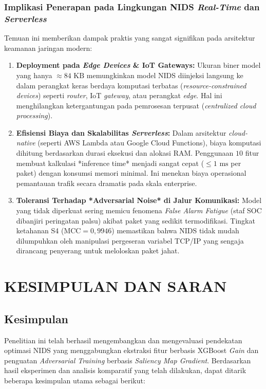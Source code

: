 \documentclass[11pt, a4paper]{article}
\begin{document}
\subsubsection{Implikasi Penerapan pada Lingkungan NIDS \textit{Real-Time} dan \textit{Serverless}}
Temuan ini memberikan dampak praktis yang sangat signifikan pada arsitektur keamanan jaringan modern:

\begin{enumerate}
    \item \textbf{Deployment pada \textit{Edge Devices} & IoT Gateways:}
    Ukuran biner model yang hanya $\approx 84\text{ KB}$ memungkinkan model NIDS diinjeksi langsung ke dalam perangkat keras berdaya komputasi terbatas (\textit{resource-constrained devices}) seperti \textit{router}, IoT \textit{gateway}, atau perangkat \textit{edge}. Hal ini menghilangkan ketergantungan pada pemrosesan terpusat (\textit{centralized cloud processing}).

    \item \textbf{Efisiensi Biaya dan Skalabilitas \textit{Serverless}:}
    Dalam arsitektur \textit{cloud-native} (seperti AWS Lambda atau Google Cloud Functions), biaya komputasi dihitung berdasarkan durasi eksekusi dan alokasi RAM. Penggunaan $10$ fitur membuat kalkulasi *inference time* menjadi sangat cepat ($\le 1\text{ ms}$ per paket) dengan konsumsi memori minimal. Ini menekan biaya operasional pemantauan trafik secara dramatis pada skala enterprise.

    \item \textbf{Toleransi Terhadap *Adversarial Noise* di Jalur Komunikasi:}
    Model yang tidak diperkuat sering memicu fenomena \textit{False Alarm Fatigue} (staf SOC dibanjiri peringatan palsu) akibat paket yang sedikit termodifikasi. Tingkat ketahanan S4 ($\text{MCC} = 0{,}9946$) memastikan bahwa NIDS tidak mudah dilumpuhkan oleh manipulasi pergeseran variabel TCP/IP yang sengaja dirancang penyerang untuk meloloskan paket jahat.
\end{enumerate}


\section{KESIMPULAN DAN SARAN}

\subsection{Kesimpulan}
Penelitian ini telah berhasil mengembangkan dan mengevaluasi pendekatan optimasi NIDS yang menggabungkan ekstraksi fitur berbasis XGBoost \textit{Gain} dan penguatan \textit{Adversarial Training} berbasis \textit{Saliency Map Gradient}. Berdasarkan hasil eksperimen dan analisis komparatif yang telah dilakukan, dapat ditarik beberapa kesimpulan utama sebagai berikut:
\end{document}
